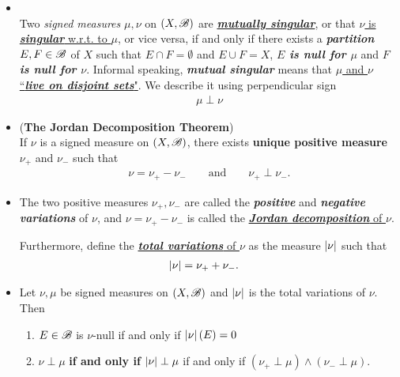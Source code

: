 \documentclass[11pt]{article}
\begin{document}
\begin{itemize}
\item  \begin{definition}\citep{folland2013real}\\
Two \emph{signed measures} $\mu, \nu$ on $(X,{\mathscr B})$ are \underline{\emph{\textbf{mutually singular}}}, or that \underline{$\nu$ is \emph{\textbf{singular}} w.r.t. to $\mu$}, or vice versa, if and only if there exists a \emph{\textbf{partition}} $E,F\in {\mathscr B}$ of $X$ such that $E\cap F = \emptyset$ and $E\cup F= X$, \emph{\textbf{$E$ is null for $\mu$}} and \emph{\textbf{$F$ is null for $\nu$}}.  Informal speaking, \emph{\textbf{mutual singular}} means that \underline{$\mu$ and $\nu$ ``\emph{\textbf{live on disjoint sets}}"}. We describe it using perpendicular sign
\begin{align*}
\mu \perp \nu
\end{align*}
\end{definition}

\item  \begin{theorem}(\textbf{The Jordan Decomposition Theorem})\citep{folland2013real}\\
If $\nu$ is a signed measure on $(X,{\mathscr B})$, there exists \textbf{unique positive measure} $\nu_{+}$ and  $\nu_{-}$ such that 
\begin{align*}
\nu = \nu_{+} - \nu_{-} \qquad \text{and} \qquad \nu_{+} \perp \nu_{-}.
\end{align*}
\end{theorem}

\item \begin{definition}
The two positive measures $\nu_{+}, \nu_{-}$ are called the \emph{\textbf{positive}} and \emph{\textbf{negative variations}} of $\nu$, and $\nu= \nu_{+} - \nu_{-} $ is called the   \underline{\emph{\textbf{Jordan decomposition}} of $\nu$}.

Furthermore, define the \underline{\emph{\textbf{total variations}} of $\nu$} as the measure $\left\lvert \nu \right\rvert$ such that 
\begin{align*}
\left\lvert \nu \right\rvert &=  \nu_{+} + \nu_{-}.
\end{align*}
\end{definition}

\item \begin{proposition}
Let $\nu, \mu$ be  signed measures on $(X, {\mathscr B})$ and $\left\lvert \nu \right\rvert$ is the total variations of $\nu$.  Then
\begin{enumerate}
\item $E \in {\mathscr B}$ is $\nu$-null if and only if $\left\lvert \nu \right\rvert(E)=0$
\item $\nu \perp \mu$ \textbf{if and only if} $\left\lvert \nu \right\rvert\perp \mu$ if and only if $(\nu_{+} \perp \mu) \wedge (\nu_{-} \perp \mu)$.
\end{enumerate}
\end{proposition}


\end{itemize}
\end{document}
